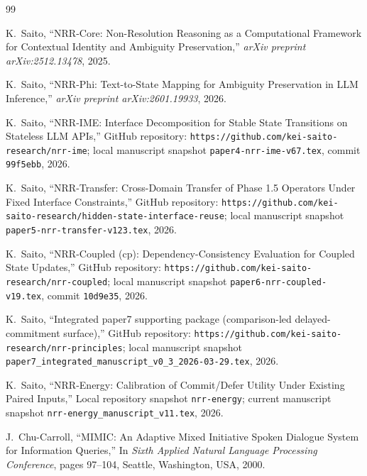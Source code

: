 \documentclass[11pt]{article}
\begin{document}
\begin{thebibliography}{99}
\raggedright

K.~Saito,
\newblock ``NRR-Core: Non-Resolution Reasoning as a Computational Framework for Contextual Identity and Ambiguity Preservation,''
\newblock \emph{arXiv preprint arXiv:2512.13478}, 2025.

K.~Saito,
\newblock ``NRR-Phi: Text-to-State Mapping for Ambiguity Preservation in LLM Inference,''
\newblock \emph{arXiv preprint arXiv:2601.19933}, 2026.

K.~Saito,
\newblock ``NRR-IME: Interface Decomposition for Stable State Transitions on Stateless LLM APIs,''
\newblock GitHub repository: \texttt{https://github.com/kei-saito-research/nrr-ime}; local manuscript snapshot \texttt{paper4-nrr-ime-v67.tex}, commit \texttt{99f5ebb}, 2026.

K.~Saito,
\newblock ``NRR-Transfer: Cross-Domain Transfer of Phase 1.5 Operators Under Fixed Interface Constraints,''
\newblock GitHub repository: \texttt{https://github.com/kei-saito-research/hidden-state-interface-reuse}; local manuscript snapshot \texttt{paper5-nrr-transfer-v123.tex}, 2026.

K.~Saito,
\newblock ``NRR-Coupled (cp): Dependency-Consistency Evaluation for Coupled State Updates,''
\newblock GitHub repository: \texttt{https://github.com/kei-saito-research/nrr-coupled}; local manuscript snapshot \texttt{paper6-nrr-coupled-v19.tex}, commit \texttt{10d9e35}, 2026.

K.~Saito,
\newblock ``Integrated paper7 supporting package (comparison-led delayed-commitment surface),''
\newblock GitHub repository: \texttt{https://github.com/kei-saito-research/nrr-principles}; local manuscript snapshot \texttt{paper7\_integrated\_manuscript\_v0\_3\_2026-03-29.tex}, 2026.

K.~Saito,
\newblock ``NRR-Energy: Calibration of Commit/Defer Utility Under Existing Paired Inputs,''
\newblock Local repository snapshot \texttt{nrr-energy}; current manuscript snapshot \texttt{nrr-energy\_manuscript\_v11.tex}, 2026.

J.~Chu-Carroll,
\newblock ``MIMIC: An Adaptive Mixed Initiative Spoken Dialogue System for Information Queries,''
\newblock In \emph{Sixth Applied Natural Language Processing Conference}, pages 97--104, Seattle, Washington, USA, 2000.


\end{thebibliography}
\end{document}

